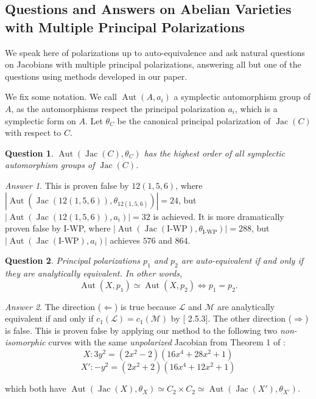 \documentclass[12pt,reqno]{amsart}
\DeclareMathOperator{\Aut}{Aut}
\DeclareMathOperator{\Jac}{Jac}
\newcommand{\mc}{\mathcal}
\newtheorem*{question}{Question}
\theoremstyle{definition}
\theoremstyle{remark}
\newtheorem*{answer}{Answer}
\begin{document}
\subsection{Questions and Answers on Abelian Varieties with Multiple Principal Polarizations}
\label{sec:questions}


We speak here of polarizations up to auto-equivalence and ask natural questions on Jacobians with multiple principal polarizations, answering all but one of the questions using methods developed in our paper.

We fix some notation. We call $\Aut(A, a_i)$ a symplectic automorphism group of $A$, as the automorphisms respect the principal polarization $a_i$, which is a symplectic form on $A$. Let $\theta_C$ be the canonical principal polarization of $\Jac(C)$ with respect to $C$.

\begin{question} $\Aut(\Jac(C), \theta_C)$ has the highest order of all symplectic automorphism groups of $\Jac(C)$. \end{question}

\begin{answer} This is proven false by $12(1,5,6)$, where $|\Aut(\Jac(12(1, 5, 6)), \theta_{12(1, 5, 6)})| = 24$, but $|\Aut(\Jac(12(1, 5, 6)), a_i)| = 32$ is achieved. It is more dramatically proven false by I-WP, where $|\Aut(\Jac(\text{I-WP}), \theta_{\text{I-WP}})| = 288$, but $|\Aut(\Jac(\text{I-WP}), a_i)|$ achieves $576$ and $864$. \end{answer}

\begin{question} Principal polarizations $p_1$ and $p_2$ are auto-equivalent if and only if they are analytically equivalent. In other words, $$\Aut(X, p_1) \simeq \Aut(X, p_2) \Leftrightarrow p_1 = p_2.$$ \end{question}

\begin{answer} The direction ($\Leftarrow$) is true because $\mc{L}$ and $\mc{M}$ are analytically equivalent if and only if $c_1(\mc{L}) = c_1(\mc{M})$ by [\cite{bl} 2.5.3]. The other direction ($\Rightarrow$) is false.  This is proven false by applying our method to the following two \textit{non-isomorphic} curves with the same \textit{unpolarized} Jacobian from Theorem 1 of \cite{howe1}:
\vspace{-2pt}
$$X: 3y^2 = (2x^2- 2)(16x^4 + 28x^2 + 1)$$ 
\vspace{-15pt}
$$X': -y^2 = (2x^2 + 2)(16x^4 + 12x^2 + 1)$$ 

\noindent which both have $\Aut(\Jac(X), \theta_X)\simeq C_2 \times C_2 \simeq \Aut(\Jac(X'), \theta_{X'})$. \end{answer}
\end{document}
